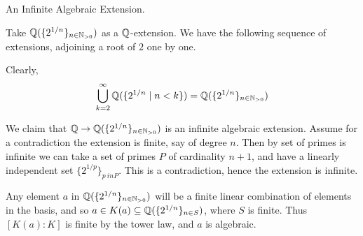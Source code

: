 \documentclass[../book.tex]{subfiles}
\begin{document}
\begin{ex} An Infinite Algebraic Extension.

    Take $\mathbb{Q}(\{2^{1/n}\}_{n \in \mathbb{N}_{>0}})$ as a $\mathbb{Q}$-extension. 
    We have the following sequence of extensions, 
    adjoining a root of $2$ one by one. 
    \begin{figure}[H]
        \centering
    \end{figure}
    Clearly, \[
        \bigcup_{k = 2}^\infty \mathbb{Q}(\{2^{1/n} \mid n < k\}) = 
        \mathbb{Q}(\{2^{1/n}\}_{n \in \mathbb{N}_{>0}})
    \]
    
    We claim that $\mathbb{Q} \to \mathbb{Q}(\{2^{1/n}\}_{n \in \mathbb{N}_{>0}})$ 
    is an infinite algebraic extension. 
    Assume for a contradiction the extension is finite, 
    say of degree $n$. 
    Then by set of primes is infinite we can take a set of primes 
    $P$ of cardinality $n+1$, 
    and have a linearly independent set $\{2^{1/p}\}_{p\ in P}$.
    This is a contradiction, hence the extension is infinite.
    
    Any element $a$ in $\mathbb{Q}(\{2^{1/n}\}_{n \in \mathbb{N}_{>0}})$ 
    will be a finite linear combination of elements in the basis, 
    and so $a \in K(a) \subseteq \mathbb{Q}(\{2^{1/n}\}_{n \in S})$, where $S$ is finite. 
    Thus $[K(a):K]$ is finite by the tower law, and $a$ is algebraic.
    
\end{ex}
\end{document}
